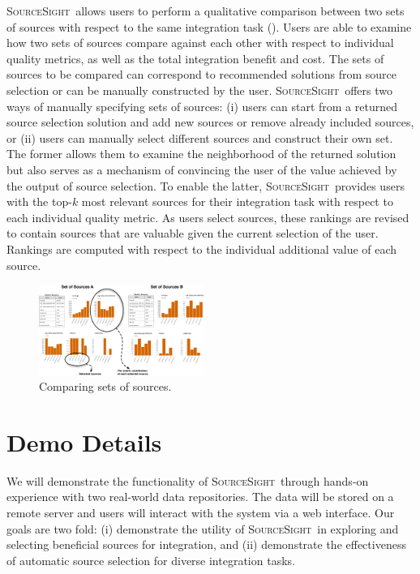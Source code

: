 \documentclass{vldb}
\newcommand\system{\textsc{SourceSight}}
\begin{document}
\system~allows users to perform a qualitative comparison between two sets of sources with respect to the same integration task (). Users are able to examine how two sets of sources compare against each other with respect to individual quality metrics, as well as the total integration benefit and cost. The sets of sources to be compared can correspond to recommended solutions from source selection or can be manually constructed by the user. \system~offers two ways of manually specifying sets of sources: (i) users can start from a returned source selection solution and add new sources or remove already included sources, or (ii) users can manually select different sources and construct their own set. The former allows them to examine the neighborhood of the returned solution but also serves as a mechanism of convincing the user of the value achieved by the output of source selection. To enable the latter, \system~provides users with the top-$k$ most relevant sources for their integration task with respect to each individual quality metric. As users select sources, these rankings are revised to contain sources that are valuable given the current selection of the user. Rankings are computed with respect to the individual additional value of each source. 
\begin{figure}
	\begin{center}
	\includegraphics[trim=0 0 0 0, clip,width=0.48\textwidth]{fig/compSS}
	\vspace{-20pt}
	\caption{Comparing sets of sources.}
	\label{fig:comparison}
	\vspace{-25pt}
	\end{center}
\end{figure}

\vspace{-5pt}
\section{Demo Details}
\label{sec:details}
We will demonstrate the functionality of \system~through hands-on experience with two real-world data repositories. The data will be stored on a remote server and users will interact with the system via a web interface. Our goals are two fold: (i) demonstrate the utility of \system~in exploring and selecting beneficial sources for integration, and (ii) demonstrate the effectiveness of automatic source selection for diverse integration tasks. 
\end{document}
